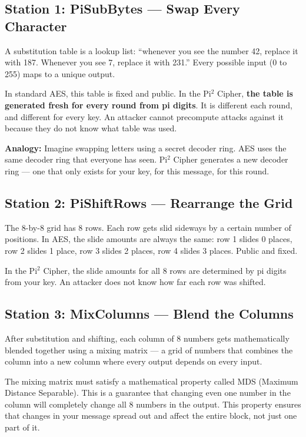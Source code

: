 \documentclass[12pt, a4paper]{article}
\begin{document}
\subsection{Station 1: PiSubBytes --- Swap Every Character}

A substitution table is a lookup list: ``whenever you see the number 42, replace it with 187. Whenever you see 7, replace it with 231.'' Every possible input (0 to 255) maps to a unique output.

In standard AES, this table is fixed and public. In the Pi$^2$ Cipher, \textbf{the table is generated fresh for every round from pi digits}. It is different each round, and different for every key. An attacker cannot precompute attacks against it because they do not know what table was used.

\begin{greenbox}
\textbf{Analogy:} Imagine swapping letters using a secret decoder ring. AES uses the same decoder ring that everyone has seen. Pi$^2$ Cipher generates a new decoder ring --- one that only exists for your key, for this message, for this round.
\end{greenbox}

\subsection{Station 2: PiShiftRows --- Rearrange the Grid}

The 8-by-8 grid has 8 rows. Each row gets slid sideways by a certain number of positions. In AES, the slide amounts are always the same: row 1 slides 0 places, row 2 slides 1 place, row 3 slides 2 places, row 4 slides 3 places. Public and fixed.

In the Pi$^2$ Cipher, the slide amounts for all 8 rows are determined by pi digits from your key. An attacker does not know how far each row was shifted.

\subsection{Station 3: MixColumns --- Blend the Columns}

After substitution and shifting, each column of 8 numbers gets mathematically blended together using a mixing matrix --- a grid of numbers that combines the column into a new column where every output depends on every input.

The mixing matrix must satisfy a mathematical property called MDS (Maximum Distance Separable). This is a guarantee that changing even one number in the column will completely change all 8 numbers in the output. This property ensures that changes in your message spread out and affect the entire block, not just one part of it.
\end{document}

